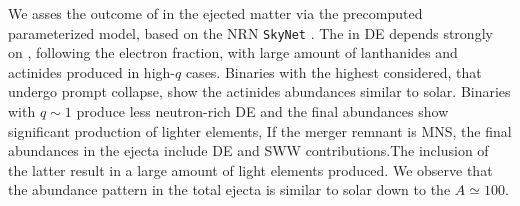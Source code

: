 We asses the outcome of \rproc{} \nuc{} in the ejected matter via the precomputed 
parameterized model, based on the \ac{NRN} \texttt{SkyNet} \citep{Lippuner:2015gwa}.
%
The \rproc{} in \ac{DE} depends strongly on \mr{}, following the electron fraction,
with large amount of lanthanides and actinides produced in high-$q$ cases.
Binaries with the highest \mr{} considered, that undergo prompt collapse, show the 
actinides abundances similar to solar.
Binaries with $q{\sim}1$ produce less neutron-rich \ac{DE} and the 
final abundances show significant production of lighter elements,
If the merger remnant is \ac{MNS}, the final \rproc{} abundances in the ejecta include 
\ac{DE} and \ac{SWW} contributions.The inclusion of the latter result in a large amount 
of light elements produced. We observe that the abundance pattern in the total ejecta 
is similar to solar down to the $A{\simeq}100$. 

